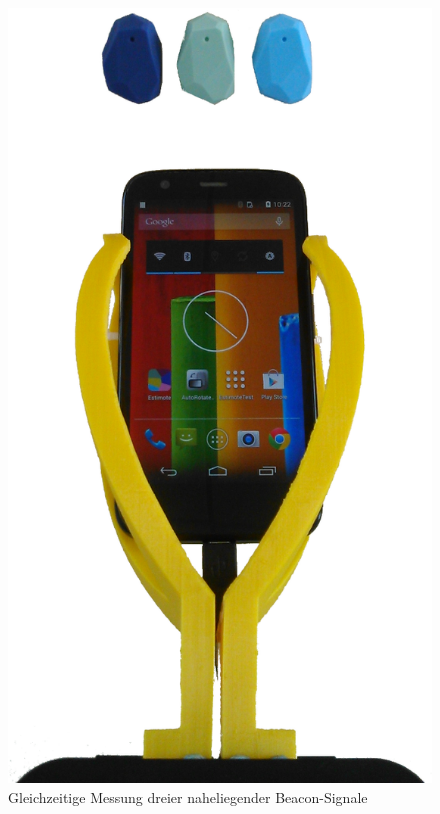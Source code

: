 \begin{figure}[H] 
\centering
\includegraphics[scale=0.17]{Bilder/MessungBeacon3}
\caption{Gleichzeitige Messung dreier naheliegender Beacon-Signale}
\label{fig:Dreier}
\end{figure}
